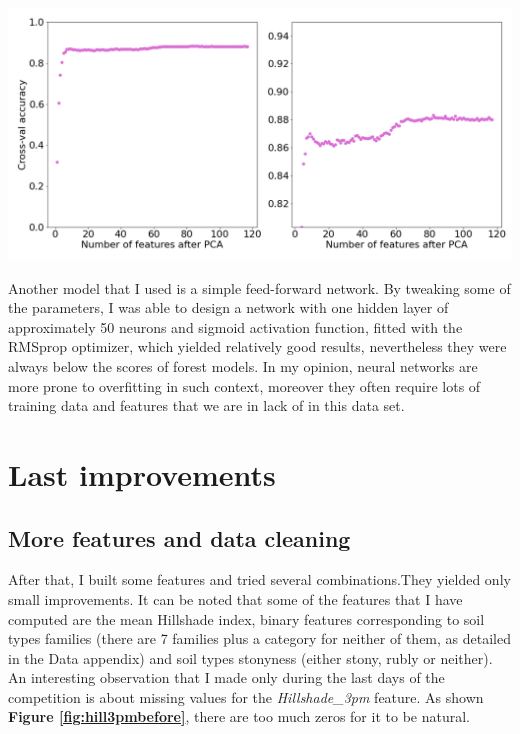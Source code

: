 \documentclass{article}
\newenvironment{Figure}
  {\par\medskip\noindent\minipage{\linewidth}}
  {\endminipage\par\medskip}
\begin{document}
\begin{multicols}{2}
\begin{Figure}
  \centering
  \captionsetup{type=figure}
  \includegraphics[width=0.85\linewidth]{figures/pca.png}
  \label{fig:pca}
\end{Figure}

Another model that I used is a simple feed-forward network. By tweaking 
some of the parameters, I was able to design a network with one hidden layer 
of approximately 50 neurons and sigmoid activation function, fitted with the 
RMSprop optimizer, which yielded 
relatively good results, nevertheless they were always below the scores 
of forest models. In my opinion, neural networks are more prone to overfitting 
in such context, moreover they often require lots of training data and features that 
we are in lack of in this data set.

\section{Last improvements}

\subsection{More features and data cleaning}

After that, I built some features and tried several combinations.They yielded only
small improvements. It can be noted that some of the features that
I have computed are the mean Hillshade index, binary features corresponding to
soil types families (there are 7 families plus a category for neither of them, as
detailed in the Data appendix) and soil types stonyness (either stony, rubly or
neither). An interesting observation that I made only during the last days of the
competition is about missing values for the \textit{Hillshade\_3pm} feature. As
shown \textbf{Figure \ref{fig:hill3pmbefore}}, there are too much zeros for it to be
natural.


\end{multicols}
\end{document}
